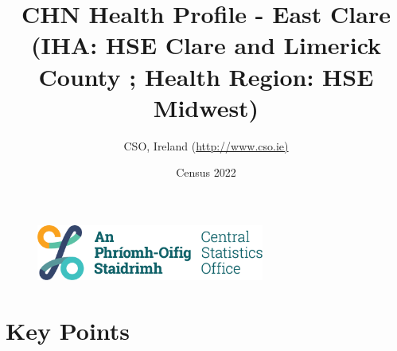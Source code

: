 \documentclass{article}
\title{CHN Health Profile - East Clare (IHA: HSE Clare and Limerick County ;  Health Region: HSE Midwest) }
\date{Census 2022}
\author{CSO, Ireland  (\url{http://www.cso.ie)}}
\begin{document}


\begin{figure}
	\centering
\includegraphics[width =75mm]{../figures/CSO_Logo.png}
\end{figure}

				 
		   
						  
														  
																																													
												 
			 
\maketitle
					
													   
				 
						 
																																																																											   
				 
				  
  \pagebreak
    	    \tableofcontents

\pagebreak


\section{Key Points}
\end{document}
